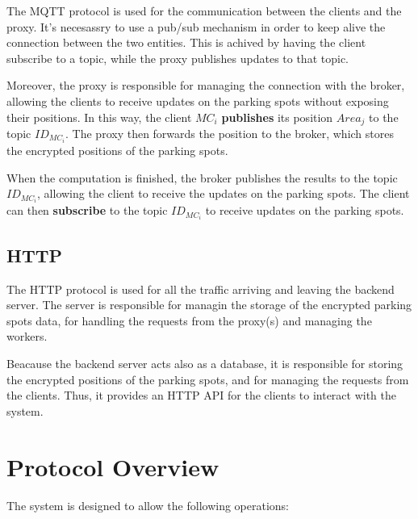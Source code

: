 \documentclass[12pt,a4paper,twoside]{book}
\begin{document}
The MQTT protocol is used for the communication between the clients and the proxy. It's necesassry to use a pub/sub mechanism in order to keep alive the connection between the two entities. This is achived by having the client subscribe to a topic, while the proxy publishes updates to that topic.

Moreover, the proxy is responsible for managing the connection with the broker, allowing the clients to receive updates on the parking spots without exposing their positions. In this way, the client $MC_i$ \textbf{publishes} its position $Area_j$ to the topic $ID_{MC_i}$. The proxy then forwards the position to the broker, which stores the encrypted positions of the parking spots.

When the computation is finished, the broker publishes the results to the topic $ID_{MC_i}$, allowing the client to receive the updates on the parking spots. The client can then \textbf{subscribe} to the topic $ID_{MC_i}$ to receive updates on the parking spots.

\subsection{HTTP}
The HTTP protocol is used for all the traffic arriving and leaving the backend server. The server is responsible for managin the storage of the encrypted parking spots data, for handling the requests from the proxy(s) and managing the workers.

Beacause the backend server acts also as a database, it is responsible for storing the encrypted positions of the parking spots, and for managing the requests from the clients. Thus, it provides an HTTP API for the clients to interact with the system. 

\newpage

\section{Protocol Overview}
The system is designed to allow the following operations:
\end{document}
